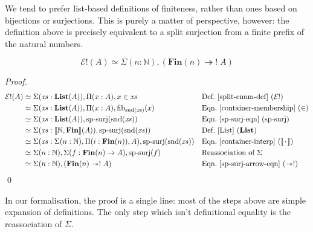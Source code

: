We tend to prefer list-based definitions of finiteness, rather than ones based
on bijections or surjections.
This is purely a matter of perspective, however: the definition above is
precisely equivalent to a split surjection from a finite prefix of the natural
numbers.
\begin{romlemma} \label{split-enum-is-split-surj}
  \begin{equation}
    \mathcal{E}!(A) \simeq \Sigma (n : \mathbb{N}) , \left( \mathbf{Fin}(n) \twoheadrightarrow ! \; A \right)
  \end{equation}
\end{romlemma}
\begin{proof}
  \begin{align*}
    \mathcal{E}!(A)
    & \simeq \Sigma (\mathit{xs} : \textbf{List}(A)) , \Pi {(x : A)} , x \in \mathit{xs}
    && \text{Def.~\ref{split-enum-def} }(\mathcal{E}!)
    \\
    & \simeq \Sigma (\mathit{xs} : \textbf{List}(A)) , \Pi {(x : A)} , \text{fib}_{\text{snd}(\mathit{xs})}(x)
    && \text{Eqn.~\ref{container-membership} } (\in)
    \\
    & \simeq \Sigma (\mathit{xs} : \textbf{List}(A)) , \text{sp-surj}(\text{snd}(\mathit{xs}))
    && \text{Eqn.~\ref{sp-surj-eqn} (sp-surj)}
    \\
    & \simeq \Sigma (\mathit{xs} : \llbracket \mathbb{N} , \mathbf{Fin} \rrbracket (A)) , \text{sp-surj}(\text{snd}(\mathit{xs}))
    && \text{Def.~\ref{List} } (\mathbf{List})
    \\
    & \simeq \Sigma (\mathit{xs} : \Sigma (n : \mathbb{N}) , \Pi (i : \mathbf{Fin}(n)) , A) , \text{sp-surj}(\text{snd}(\mathit{xs}))
    && \text{Eqn.~\ref{container-interp} } (\llbracket {\mkern 2mu\cdot\mkern 2mu} \rrbracket)
    \\
    & \simeq \Sigma (n : \mathbb{N}) , \Sigma (f : \mathbf{Fin}(n) \rightarrow A) , \text{sp-surj}(f)
    && \text{Reassociation of } \Sigma
    \\
    & \simeq \Sigma (n : \mathbb{N}) , ( \mathbf{Fin}(n) \twoheadrightarrow ! \; A )
    && \text{Eqn.~\ref{sp-surj-arrow-eqn} } (\twoheadrightarrow!)
  \end{align*}
  \qed
\end{proof}

In our formalisation, the proof is a single line: most of the steps above are
simple expansion of definitions.
The only step which isn't definitional equality is the reassociation of
\(\Sigma\).

